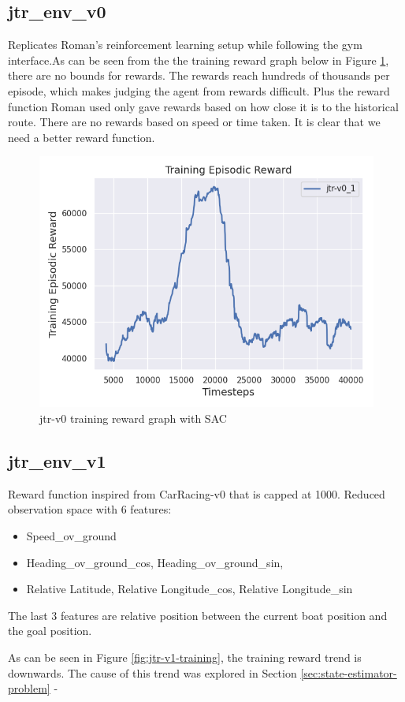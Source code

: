 \subsection*{jtr\_env\_v0}
Replicates Roman's reinforcement learning setup while following the gym interface.As can be seen from the the training reward graph below in Figure \ref{fig:jtr-v0}, there are no bounds for rewards. The rewards reach hundreds of thousands per episode, which makes judging the agent from rewards difficult. Plus the reward function Roman \cite{roman} used only gave rewards based on how close it is to the historical route. There are no rewards based on speed or time taken. It is clear that we need a better reward function.

\begin{figure}[h]
\centering
\includegraphics[width = 0.6\hsize]{figures/rl-refinements/jtr-v0.png}
\caption{jtr-v0 training reward graph with SAC}
\label{fig:jtr-v0}
\end{figure}

\subsection*{jtr\_env\_v1}
Reward function inspired from CarRacing-v0 \cite{CarRacing-v0} that is capped at 1000.
Reduced observation space with 6 features: 
\begin{itemize}
    \item Speed\_ov\_ground
    \item Heading\_ov\_ground\_cos, Heading\_ov\_ground\_sin,
    \item  Relative Latitude, Relative Longitude\_cos, Relative Longitude\_sin
\end{itemize}
The last 3 features are relative position between the current boat position and the goal position.

As can be seen in Figure \ref{fig:jtr-v1-training}, the training reward trend is downwards. The cause of this trend was explored in Section \ref{sec:state-estimator-problem} - 

